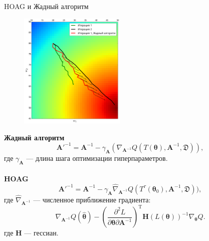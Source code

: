 \documentclass[11pt,pdf,utf8,russian,aspectratio=169]{beamer}
\begin{document}
\begin{frame}{HOAG и Жадный алгоритм}
\begin{multicols}{2}
\begin{figure}[h]
\includegraphics[width=0.45\textwidth]{./slide_plots/greed_hoag.png}
\end{figure}
\columnbreak
\textbf{Жадный алгоритм}
\[
	\mathbf{A}'^{-1} = \mathbf{A}^{-1} - \gamma_{\mathbf{A}} (\nabla_{\mathbf{A}^{-1}}  Q (T(\boldsymbol{\theta}) , \mathbf{A}^{-1}, \mathfrak{D})), %
\]
где $\gamma_{\mathbf{A}}$ --- длина шага оптимизации гиперпараметров.
\\~\\
\textbf{HOAG}
\[
\mathbf{A}'^{-1} = \mathbf{A}^{-1} - \gamma_{\mathbf{A}} \hat{\nabla}_{\mathbf{A}^{-1}} Q(T^\tau(\boldsymbol{\theta}_0),  \mathbf{A}^{-1}, \mathfrak{D})),
\]
где $\hat{\nabla}_{\mathbf{A}^{-1}}$ --- численное приближение градиента:
\[
\nabla_{\mathbf{A}^{-1}} Q(\hat{\boldsymbol{\theta}}) - (\frac{\partial^2{L}}{\partial \boldsymbol{\theta} \partial \mathbf{A}^{-1}})^\text{T} \mathbf{H}(L({\boldsymbol{\theta}}))^{-1} \nabla_{\boldsymbol{\theta}} Q.
\]
где $\mathbf{H}$ --- гессиан.
\end{multicols}
\end{frame}
\end{document}
